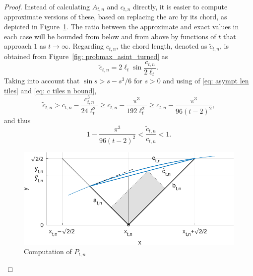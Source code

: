 \documentclass[12pt, a4paper]{article}
\newcommand{\len}{\ell} %
\newcommand{\tiles}{t} %
\newcommand{\genvar}{s}
\begin{document}
\begin{proof}
Instead of calculating  $A_{\tiles,n}$ and $c_{\tiles,n}$ directly, it is easier to compute approximate versions of these, based on replacing the arc by its chord, as depicted in Figure~\ref{fig: probmax_asint_detail}. The ratio between the approximate and exact values in each case will be bounded from below and from above by functions of $\tiles$ that approach $1$ as $\tiles \rightarrow \infty$. Regarding $c_{\tiles,n}$, the chord length, denoted as $\tilde c_{\tiles,n}$, is obtained from Figure~\ref{fig: probmax_asint_turned} as
\begin{equation}
\tilde c_{\tiles,n} =  2\len_\tiles \sin\frac{c_{\tiles,n}}{2\len_\tiles}. 
\end{equation}
Taking into account that $\sin\genvar > \genvar - {\genvar^3}/6$ for $s > 0$ and using of \eqref{eq: asympt len tiles} and \eqref{eq: c tiles n bound},
\begin{equation}
\tilde c_{\tiles,n}> c_{\tiles,n} -\frac{c_{\tiles,n}^3}{24\len_\tiles^2} \geq c_{\tiles,n} -\frac{\pi^3}{192\len_\tiles^2} \geq c_{\tiles,n} - \frac {\pi^3} {96(\tiles-2)^2},
\end{equation}
and thus
\begin{equation}
\label{eq: tilde c bound}
1 - \frac {\pi^3} {96(\tiles-2)^2} < \frac{\tilde c_{\tiles,n}}{c_{\tiles,n}} < 1.
\end{equation}

\begin{figure}
\centering
\includegraphics[width=.82\textwidth]{probmax_asint_detail}%
\caption{Computation of $P_{\tiles,n}$}%
\label{fig: probmax_asint_detail}%
\end{figure}%


\end{proof}
\end{document}
